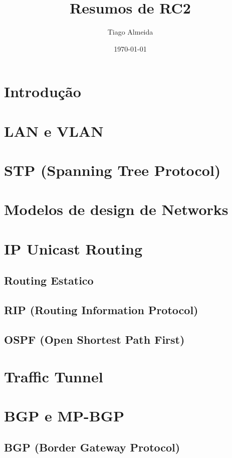 \documentclass[a4paper, 12pt, onecolumn, oneside]{scrartcl}
\title{\large{Resumos de RC2}}
\author{Tiago Almeida}
\date{\today}
\begin{document}
\maketitle

\tableofcontents

\section{Introdução}

\section{LAN e VLAN}

\section{STP (Spanning Tree Protocol)}

\section{Modelos de design de Networks}

\section{IP Unicast Routing}
\subsection{Routing Estatico}
\subsection{RIP (Routing Information Protocol)}
\subsection{OSPF (Open Shortest Path First)}

\section{Traffic Tunnel}

\section{BGP e MP-BGP}
\subsection{BGP (Border Gateway Protocol)}
\end{document}
